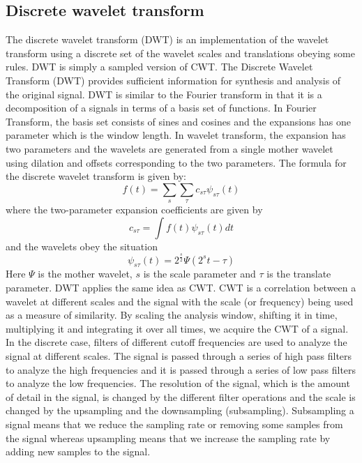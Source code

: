 \subsection{Discrete wavelet transform}
The discrete wavelet transform (\ac{DWT}) is an implementation of the wavelet transform using a discrete set of the wavelet scales and translations obeying some rules. DWT is simply a sampled version of \ac{CWT}. The Discrete Wavelet Transform (\ac{DWT}) provides sufficient information for synthesis and analysis of the original signal. \ac{DWT} is similar to the Fourier transform in that it is a decomposition of a signals in terms of a basis set of functions. In Fourier Transform, the basis set consists of sines and cosines and the expansions has one parameter which is the window length. In wavelet transform, the expansion has two parameters and the wavelets are generated from a single mother wavelet using dilation and offsets corresponding to the two parameters. The formula for the discrete wavelet transform is given by:
\begin{equation*}
f(t) = \sum_s\sum_{\tau} c_{s\tau} \psi_{s\tau} (t)
\end{equation*}
where the two-parameter expansion coefficients are given by
\begin{equation*}
c_{s \tau} = \int f(t) \psi_{s \tau}(t)dt
\end{equation*}
and the wavelets obey the situation
\begin{equation*}
\psi_{s\tau}(t) = 2^{\frac{s}{2}} \Psi(2^s t-\tau)
\end{equation*}
Here $\Psi$ is the mother wavelet, $s$ is the scale parameter and $\tau$ is the translate parameter. DWT applies the same idea as CWT. CWT is a correlation between a wavelet at different scales and the signal with the scale (or frequency) being used as a measure of similarity. By scaling the analysis window, shifting it in time, multiplying it and integrating it over all times, we acquire the CWT of a signal. \\
In the discrete case, filters of different cutoff frequencies are used to analyze the signal at different scales. The signal is passed through a series of high pass filters to analyze the high frequencies and it is passed through a series of low pass filters to analyze the low frequencies. The resolution of the signal, which is the amount of detail in the signal, is changed by the different filter operations and the scale is changed by the upsampling and the downsampling (subsampling). Subsampling a signal means that we reduce the sampling rate or removing some samples from the signal whereas upsampling means that we increase the sampling rate by adding new samples to the signal.
